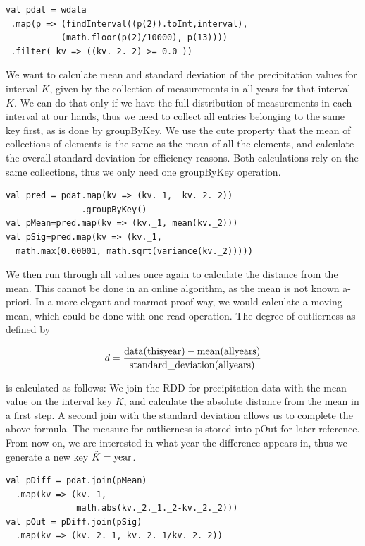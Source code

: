 \documentclass[
10pt, %
a4paper, %
oneside, %
headinclude,footinclude, %
useAMS,
usenatbib
]{mn2e}  %
\begin{document}
\begin{verbatim}
val pdat = wdata
 .map(p => (findInterval((p(2)).toInt,interval),
           (math.floor(p(2)/10000), p(13))))
 .filter( kv => ((kv._2._2) >= 0.0 ))
\end{verbatim}

We want to calculate mean and standard deviation of the precipitation values for interval $K$, given by the collection of measurements in all years for that interval $K$. We can do that only if we have the full distribution of measurements in each interval at our hands, thus we need to collect all entries belonging to the same key first, as is done by groupByKey. We use the cute property that the mean of collections of elements is the same as the mean of all the elements, and calculate the overall standard deviation for efficiency reasons. Both calculations rely on the same collections, thus we only need one groupByKey operation.

\begin{verbatim}
val pred = pdat.map(kv => (kv._1,  kv._2._2))
               .groupByKey()
val pMean=pred.map(kv => (kv._1, mean(kv._2)))
val pSig=pred.map(kv => (kv._1,
  math.max(0.00001, math.sqrt(variance(kv._2)))))
\end{verbatim}

We then run through all values once again to calculate the distance from the mean. This cannot be done in an online algorithm, as the mean is not known a-priori. In a more elegant and marmot-proof way, we would calculate a moving mean, which could be done with one read operation. The degree of outlierness as defined by

\begin{equation*}
d = \frac{\rm{data}(\rm{this year}) - \rm{mean}(\rm{all years})}{\rm{standard\_deviation}(\rm{all years})}
\end{equation*}

is calculated as follows: We join the RDD for precipitation data with the mean value on the interval key $K$, and calculate the absolute distance from the mean in a first step. A second join with the standard deviation allows us to complete the above formula. The measure for outlierness is stored into pOut for later reference.  From now on, we are interested in what year the difference appears in, thus we generate a new key $\tilde{K}=\rm{year}$.

\begin{verbatim}
val pDiff = pdat.join(pMean)
  .map(kv => (kv._1,
              math.abs(kv._2._1._2-kv._2._2)))
val pOut = pDiff.join(pSig)
  .map(kv => (kv._2._1, kv._2._1/kv._2._2))
\end{verbatim}
\end{document}
